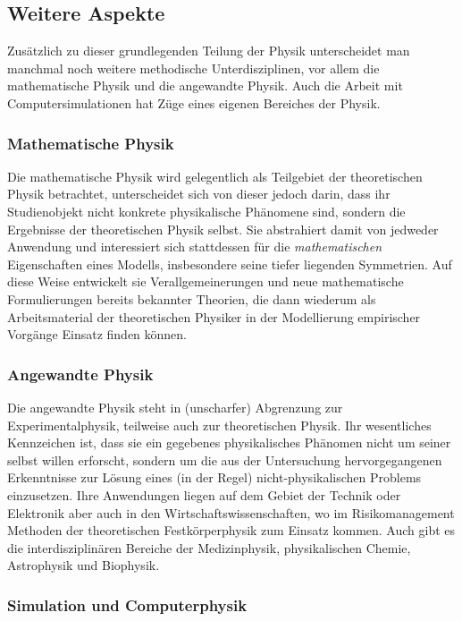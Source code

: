 \documentclass[titlepage, parkskip=full, twocolumn, landscape]{scrartcl}
\begin{document}
\subsection{Weitere Aspekte}

Zusätzlich zu dieser grundlegenden Teilung der Physik unterscheidet man manchmal noch weitere methodische Unterdisziplinen, vor allem die mathematische Physik und die angewandte Physik. Auch die Arbeit mit Computersimulationen hat Züge eines eigenen Bereiches der Physik.

\subsubsection{Mathematische Physik}

Die mathematische Physik wird gelegentlich als Teilgebiet der theoretischen Physik betrachtet, unterscheidet sich von dieser jedoch darin, dass ihr Studienobjekt nicht konkrete physikalische Phänomene sind, sondern die Ergebnisse der theoretischen Physik selbst. Sie abstrahiert damit von jedweder Anwendung und interessiert sich stattdessen für die \emph{mathematischen} Eigenschaften eines Modells, insbesondere seine tiefer liegenden Symmetrien. Auf diese Weise entwickelt sie Verallgemeinerungen und neue mathematische Formulierungen bereits bekannter Theorien, die dann wiederum als Arbeitsmaterial der theoretischen Physiker in der Modellierung empirischer Vorgänge Einsatz finden können.

\subsubsection{Angewandte Physik}

Die angewandte Physik steht in (unscharfer) Abgrenzung zur Experimentalphysik, teilweise auch zur theoretischen Physik. Ihr wesentliches Kennzeichen ist, dass sie ein gegebenes physikalisches Phänomen nicht um seiner selbst willen erforscht, sondern um die aus der Untersuchung hervorgegangenen Erkenntnisse zur Lösung eines (in der Regel) nicht-physikalischen Problems einzusetzen. Ihre Anwendungen liegen auf dem Gebiet der Technik oder Elektronik aber auch in den Wirtschaftswissenschaften, wo im Risikomanagement Methoden der theoretischen Festkörperphysik zum Einsatz kommen. Auch gibt es die interdisziplinären Bereiche der Medizinphysik, physikalischen Chemie, Astrophysik und Biophysik.

\subsubsection{Simulation und Computerphysik}
\end{document}
